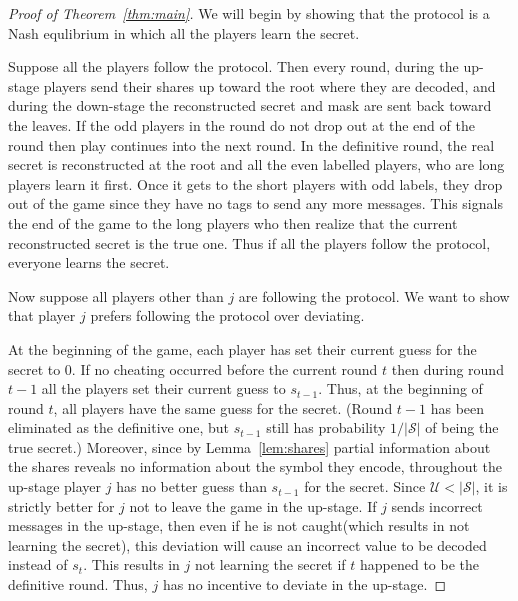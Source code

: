 \documentclass[12pt]{article}
\theoremstyle{definition}
\newcommand{\U}{\mathcal{U}}
\renewcommand{\S}{\mathcal{S}}
\begin{document}
\begin{proof}[Proof of Theorem~\ref{thm:main}]
We will begin by showing that the protocol is a Nash equlibrium 
in which all the players learn the secret.

Suppose all the players follow the protocol. Then every round, during the 
up-stage players send their shares up toward the root where they are decoded, 
and during the down-stage the reconstructed secret and mask are sent back 
toward the leaves.  If the odd players in the round do not drop out at the 
end of the round then play continues into the next round. In the definitive 
round, the real secret is reconstructed at the root and all the even 
labelled players, who are long players learn it first. Once it gets to the 
short players with odd labels, they drop out of the game since they have no 
tags to send any more messages. This signals the end of the game to the long 
players who then realize that the current reconstructed secret is the true one. 
Thus if all the players follow the protocol, everyone learns the secret.

Now suppose all players other than $j$ are following the protocol. We want 
to show that player $j$ prefers following the protocol over 
deviating.  

At the beginning of the game, each player has set their current guess for the 
secret to 0. If no cheating occurred before the current round $t$ then 
during round
$t-1$ all the players set their current guess to $s_{t-1}$. Thus, at the 
beginning of round $t$, all players have the same guess for the secret. 
(Round $t-1$ has been eliminated as the definitive one, but $s_{t-1}$ still has 
probability $1/|\S|$ of being the true secret.) Moreover, since by 
Lemma~\ref{lem:shares} partial information about the shares 
reveals no information about the symbol they encode, throughout 
the up-stage player $j$ has no better guess than $s_{t-1}$ for the secret.
Since $\U < |\S|$, it is strictly better for $j$ not to leave the game in the 
up-stage. If $j$ sends incorrect messages in the up-stage, then even if he 
is not caught(which results in not learning the secret), this deviation will 
cause an incorrect value to be decoded instead of $s_t$.  This results in $j$
not learning the secret if $t$ happened to be the definitive round. Thus, 
$j$ has no incentive to deviate in the up-stage. 


\end{proof}
\end{document}
